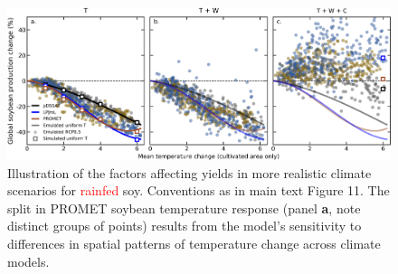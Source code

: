 \documentclass[10pt]{article}
\begin{document}
{{\begin{figure}[h!]
  \centering
  \includegraphics[width = 16.3cm]{LPJmL_pDSSAT_PROMET_RCP85_all_cases_soy.png}
  \caption{
	  Illustration of the factors affecting yields in more realistic climate scenarios for \textcolor{red}{rainfed} soy. Conventions as in main text Figure 11. The split in PROMET soybean temperature response (panel \textbf{a}, note distinct groups of points) results from the model's sensitivity to differences in spatial patterns of temperature change across climate models. 
  }
\end{figure}


\clearpage
}}
\end{document}
